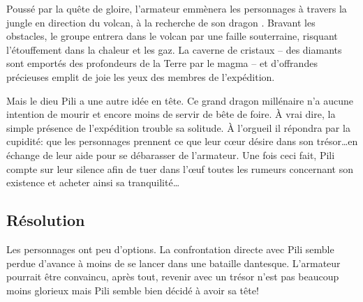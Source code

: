 Poussé par la quête de gloire, l'armateur emmènera les personnages à travers la jungle en direction du volcan, à la recherche de \og son dragon \fg.
Bravant les obstacles, le groupe entrera dans le volcan par une faille souterraine, risquant l'étouffement dans la chaleur et les gaz.
La caverne de cristaux -- des diamants sont emportés des profondeurs de la Terre par le magma -- et d'offrandes précieuses emplit de joie les yeux des membres de l'expédition.

Mais le dieu Pili a une autre idée en tête.
Ce grand dragon millénaire n'a aucune intention de mourir et encore moins de servir de bête de foire.
À vrai dire, la simple présence de l'expédition trouble sa solitude.
À l'orgueil il répondra par la cupidité: que les personnages prennent ce que leur cœur désire dans son trésor\dots en échange de leur aide pour se débarasser de l'armateur.
Une fois ceci fait, Pili compte sur leur silence afin de tuer dans l'œuf toutes les rumeurs concernant son existence et acheter ainsi sa tranquilité\dots

\subsection{Résolution}

Les personnages ont peu d'options.
La confrontation directe avec Pili semble perdue d'avance à moins de se lancer dans une bataille dantesque.
L'armateur pourrait être convaincu, après tout, revenir avec un trésor n'est pas beaucoup moins glorieux mais Pili semble bien décidé à avoir sa tête!
